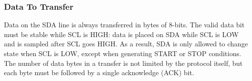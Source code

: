 \subsubsection{Data To Transfer}
\label{chap:Back_I2C_Protocol_Data}

Data on the SDA line is always transferred in bytes of 8-bits. The valid data bit 
must be stable while SCL is HIGH: data is placed on SDA while SCL is LOW 
and is sampled after SCL goes HIGH. As a result, SDA is only allowed to change 
state when SCL is LOW, except when generating START or STOP conditions. The 
number of data bytes in a transfer is not limited by the protocol itself, but each 
byte must be followed by a single acknowledge (ACK) bit.

